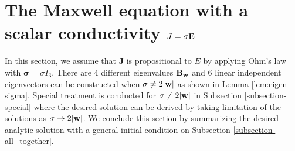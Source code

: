 \documentclass[10pt,reqno]{amsart}
\newcommand{\bS}{\boldsymbol{\sigma}}
\renewcommand{\(}{\left(}
\renewcommand{\)}{\right)}
\newcommand{\bw}{{\bf w}}
\newcommand{\EE}{{\bf E}}
\newcommand{\BB}{{\bf B}}
\newcommand{\bJ}{\mathbf{J}}
\numberwithin{equation}{section}
\begin{document}
\section{The Maxwell equation with a scalar conductivity $J=\sigma \EE$}\label{sec:j=sigmmaE}
In this section,  we assume that $\bJ$ is propositional to $E$ by applying Ohm's law \cite{bossavit} with $\bS =\sigma I_3$.  There are $4$ different eigenvalues $\BB_{\bw}$ and $6$ linear independent eigenvectors can be constructed when $\sigma\neq 2|\bw|$ as shown in Lemma \ref{lem:eigen-sigma}.  Special treatment is conducted for $\sigma\neq 2|\bw|$ in Subsection \ref{subsection-special} where the desired solution can be derived by taking limitation of the solutions as $\sigma \to 2|\bw|$.  We conclude this section by summarizing the desired analytic solution with a general initial condition on Subsection \ref{subsection-all_together}.
\end{document}
